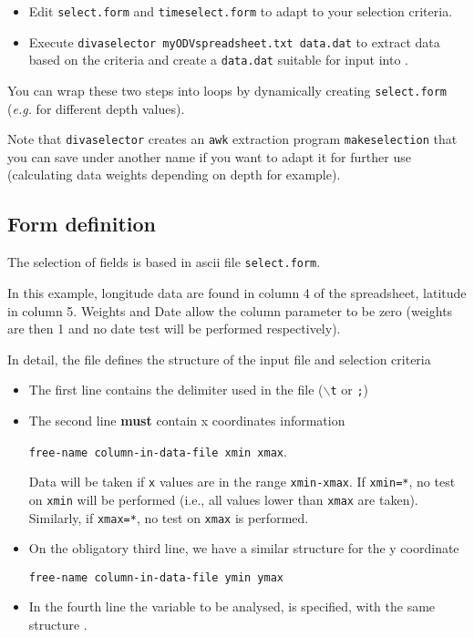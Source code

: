 \begin{itemize}
\item Edit {\tt select.form} and {\tt timeselect.form} to adapt to your selection criteria.
\item Execute {\tt divaselector myODVspreadsheet.txt data.dat} to extract data based on the criteria and create a {\tt data.dat} suitable for input into \diva.
\end{itemize}

You can wrap these two steps into loops by dynamically creating {\tt select.form} (\textit{e.g.} for different depth values).

Note that {\tt divaselector} creates an {\tt awk} extraction program {\tt makeselection} that you can save under another name if you want to adapt it for further use (calculating data weights depending on depth for example).




\subsection{Form definition}

The selection of fields is based in ascii file {\tt select.form}. 

In this example, longitude data are found in column 4 of the spreadsheet, latitude in column 5.
Weights and Date allow the column parameter to be zero (weights are then 1 and no date test will be performed respectively).

In detail, the file defines the structure of the input file and selection criteria
\begin{itemize}
\item
The first line contains the delimiter used in the file ($\backslash${\tt t} or {\tt ;})
\item 
The second line {\bf must} contain x coordinates information

{\tt free-name  column-in-data-file  xmin xmax}. 

Data will be taken if \texttt{x} values are in the range \texttt{xmin-xmax}. If \texttt{xmin=*}, no test on \texttt{xmin} will be performed (i.e., all values lower than \texttt{xmax} are taken). Similarly, if \texttt{xmax=*}, no test on \texttt{xmax} is performed.

\item On the obligatory third line, we have a similar structure for the y coordinate
 
{\tt free-name  column-in-data-file  ymin ymax}

\item In the fourth line the variable to be analysed, is specified, with the same structure .

\end{itemize}


